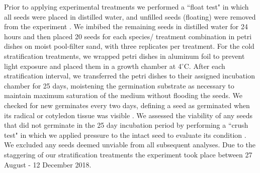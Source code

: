 \documentclass{article}[11pt]
\begin{document}
\noindent  Prior to applying experimental treatments we performed a ``float test" in which all seeds were placed in distilled water, and unfilled seeds (floating) were removed from the experiment \citep{Baskin2014}. We imbibed the remaining seeds in distilled water for 24 hours and then placed 20 seeds for each species/ treatment combination in petri dishes on moist pool-filter sand, with three replicates per treatment. For the cold stratification treatments, we wrapped petri dishes in aluminum foil to prevent light exposure and placed them in a growth chamber at 4$^{\circ}$C. After each stratification interval, we transferred the petri dishes to their assigned incubation chamber for 25 days, moistening the germination substrate as necessary to maintain maximum saturation of the medium without flooding the seeds. We checked for new germinates every two days, defining a seed as germinated when its radical or cotyledon tissue was visible \citep{Baskin2014}. We assessed the viability of any seeds that did not germinate in the 25 day incubation period by performing a ``crush test" in which we applied pressure to the intact seed to evaluate its condition \citep{Baskin2014}. We excluded any seeds deemed unviable from all subsequent analyses. Due to the staggering of our stratification treatments the experiment took place between 27 August - 12 December 2018.
\end{document}
